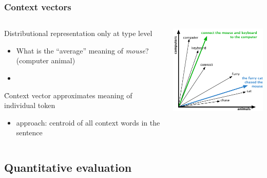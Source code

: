 \begin{frame}
  \frametitle{Context vectors \citep{Schuetze:98}}

  \gap
  \begin{columns}[c]
    \begin{column}{50mm}
      Distributional representation only at type level
      \begin{itemize}
      \item[\hand] What is the ``average'' meaning of \emph{mouse}? (computer \vs animal)
      \item[]
      \end{itemize}
      \pause
      \h{Context vector} approximates meaning of individual token
      \begin{itemize}
      \item {} approach:
        centroid of all context words in the sentence
      \end{itemize}
    \end{column}
    \begin{column}{60mm}
      \includegraphics[width=60mm]{img/illustration_context_vectors_mouse}
    \end{column}
  \end{columns}
\end{frame}


\subsection{Quantitative evaluation}



